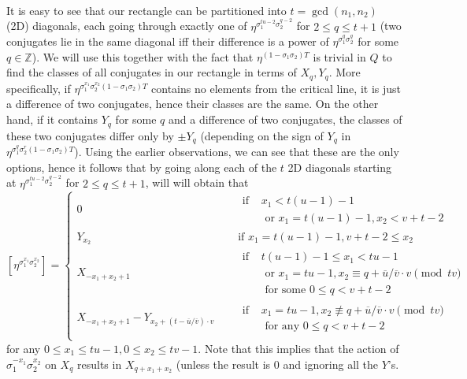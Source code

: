 \documentclass[12pt,a4paper]{article}
\newcommand{\Z}{\mathbb{Z}}
\newcommand{\uo}{\overline{u}}
\newcommand{\vo}{\overline{v}}
\begin{document}
\paragraph*{}
It is easy to see that our rectangle can be partitioned into $t=\gcd(n_1,n_2)$ (2D) diagonals, each going through exactly one of $\eta^{\sigma_1^{tu-2}\sigma_2^{q-2}}$ for $2\leq q\leq t+1$ (two conjugates lie in the same diagonal iff their difference is a power of $\eta^{\sigma_1^q\sigma_2^q}$ for some $q\in\Z$). We will use this together with the fact that $\eta^{(1-\sigma_1\sigma_2)T}$ is trivial in $Q$ to find the classes of all conjugates in our rectangle in terms of $X_q,Y_q$. More specifically, if $\eta^{\sigma_1^{x_1}\sigma_2^{x_2}(1-\sigma_1\sigma_2)T}$ contains no elements from the critical line, it is just a difference of two conjugates, hence their classes are the same. On the other hand, if it contains $Y_{q}$ for some $q$ and a difference of two conjugates, the classes of these two conjugates differ only by $\pm Y_{q}$ (depending on the sign of $Y_{q}$ in $\eta^{\sigma_1^q\sigma_2^r(1-\sigma_1\sigma_2)T}$). Using the earlier observations, we can see that these are the only options, hence it follows that by going along each of the $t$ 2D diagonals starting at $\eta^{\sigma_1^{tu-2}\sigma_2^{q-2}}$ for $2\leq q\leq t+1$, will will obtain that %
$$
[\eta^{\sigma_1^{x_1}\sigma_2^{x_2}}]=
\begin{cases}
0 \quad &\!\begin{aligned} \text{ if }  &x_1<t(u-1)-1\\ &\text{ or } x_1=t(u-1)-1, x_2< v+t-2 \end{aligned}\\
Y_{x_2} \quad &\text{ if } x_1=t(u-1)-1, v+t-2\leq x_2 \\
X_{-x_1+x_2+1} \quad &\!\begin{aligned}\text{ if } & t(u-1)-1\leq x_1<tu-1 \\&
 \text{ or }  x_1=tu-1, x_2\equiv q+\uo/\vo\cdot v\pmod{tv} \\
 &\text{ for some } 0\leq q<v+t-2  \end{aligned}\\
X_{-x_1+x_2+1}-Y_{x_2+(t-\uo/\vo)\cdot v} \quad &\!\begin{aligned}\text{ if } & x_1=tu-1, x_2\not\equiv q+\uo/\vo\cdot v\pmod{tv} \\
&\text{ for any } 0\leq q<v+t-2\end{aligned}\\
\end{cases}
$$
for any $0\leq x_1\leq tu-1, 0\leq x_2\leq tv-1$. Note that this implies that the action of $\sigma_1^{-x_1}\sigma_2^{x_2}$ on $X_q$ results in $X_{q+x_1+x_2}$ (unless the result is $0$ and ignoring all the $Y$'s.
\end{document}

